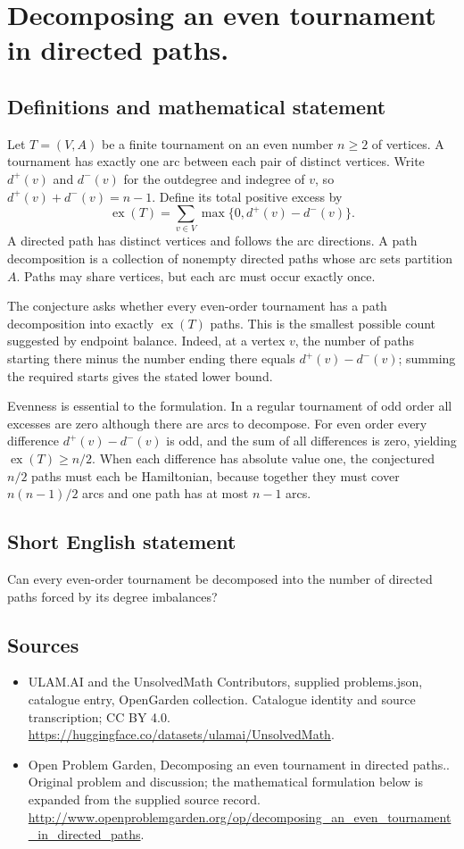 \documentclass[11pt,a4paper]{article}
\begin{document}
\section*{Decomposing an even tournament in directed paths.}\label{statement}

\subsection{Definitions and mathematical statement}
Let $T=(V,A)$ be a finite tournament on an even number $n\ge2$ of
vertices. A tournament has exactly one arc between each pair of
distinct vertices. Write $d^+(v)$ and $d^-(v)$ for the outdegree and
indegree of $v$, so $d^+(v)+d^-(v)=n-1$. Define its total positive excess
by
\[
 \operatorname{ex}(T)=\sum_{v\in V}\max\{0,d^+(v)-d^-(v)\}.
\]
A directed path has distinct vertices and follows the arc directions.
A path decomposition is a collection of nonempty directed paths whose
arc sets partition $A$. Paths may share vertices, but each arc must
occur exactly once.

The conjecture asks whether every even-order tournament has a path
decomposition into exactly $\operatorname{ex}(T)$ paths. This is the
smallest possible count suggested by endpoint balance. Indeed, at a
vertex $v$, the number of paths starting there minus the number ending
there equals $d^+(v)-d^-(v)$; summing the required starts gives the stated
lower bound.

Evenness is essential to the formulation. In a regular tournament of
odd order all excesses are zero although there are arcs to decompose.
For even order every difference $d^+(v)-d^-(v)$ is odd, and the sum of
all differences is zero, yielding $\operatorname{ex}(T)\ge n/2$.
When each difference has absolute value one, the conjectured $n/2$
paths must each be Hamiltonian, because together they must cover
$n(n-1)/2$ arcs and one path has at most $n-1$ arcs.
\subsection{Short English statement}
Can every even-order tournament be decomposed into the number of directed paths forced by its degree imbalances?
\subsection{Sources}
\begin{itemize}
\item[S1] ULAM.AI and the UnsolvedMath Contributors, supplied problems.json, catalogue entry, OpenGarden collection. Catalogue identity and source transcription; CC BY 4.0.
\url{https://huggingface.co/datasets/ulamai/UnsolvedMath}.
\item[S2] Open Problem Garden, Decomposing an even tournament in directed paths.. Original problem and discussion; the mathematical formulation below is expanded from the supplied source record.
\url{http://www.openproblemgarden.org/op/decomposing_an_even_tournament_in_directed_paths}.
\end{itemize}
\end{document}
